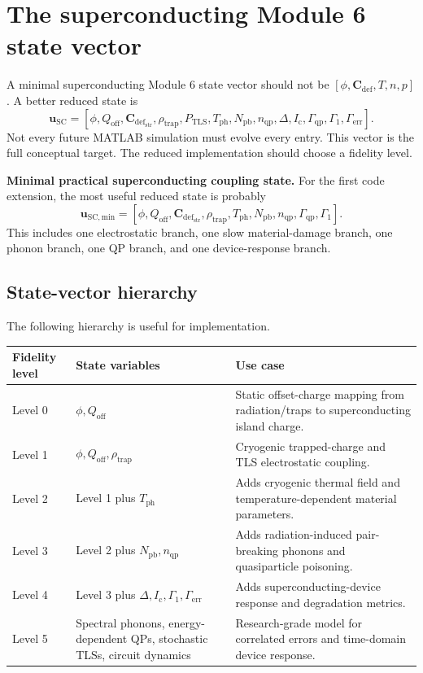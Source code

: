 \documentclass[11pt]{article}
\newcommand{\phiE}{\phi}
\newcommand{\Qoff}{Q_{\mathrm{off}}}
\newcommand{\Cvec}{\bm{C}_{\mathrm{def}}}
\newcommand{\TLS}{\mathrm{TLS}}
\newcommand{\Tph}{T_{\mathrm{ph}}}
\newcommand{\Npb}{N_{\mathrm{pb}}}
\newcommand{\DeltaSC}{\Delta}
\newcommand{\nqp}{n_{\mathrm{qp}}}
\newcommand{\Gammaqp}{\Gamma_{\mathrm{qp}}}
\newcommand{\Gammaone}{\Gamma_1}
\newcommand{\Gammaerr}{\Gamma_{\mathrm{err}}}
\newcommand{\Ic}{I_{\mathrm{c}}}
\newcommand{\state}{\bm{u}}
\begin{document}
\section{The superconducting Module 6 state vector}

A minimal superconducting Module 6 state vector should not be
\( [\phiE,\Cvec,T,n,p] \). A better reduced state is
\begin{equation}
\boxed{
\state_{\mathrm{SC}}=
\left[
\phiE,
\Qoff,
\Cvec_{\mathrm{str}},
\rho_{\mathrm{trap}},
P_{\TLS},
\Tph,
\Npb,
\nqp,
\DeltaSC,
\Ic,
\Gammaqp,
\Gammaone,
\Gammaerr
\right].}
\end{equation}
Not every future MATLAB simulation must evolve every entry. This vector is the full conceptual target. The reduced implementation should choose a fidelity level.

\begin{physicsbox}
\textbf{Minimal practical superconducting coupling state.} For the first code extension, the most useful reduced state is probably
\begin{equation}
\state_{\mathrm{SC,min}}=
\left[\phiE,\Qoff,\Cvec_{\mathrm{str}},\rho_{\mathrm{trap}},\Tph,\Npb,\nqp,\Gammaqp,\Gammaone\right].
\end{equation}
This includes one electrostatic branch, one slow material-damage branch, one phonon branch, one QP branch, and one device-response branch.
\end{physicsbox}

\subsection{State-vector hierarchy}

The following hierarchy is useful for implementation.

\begin{center}
\begin{tabularx}{\textwidth}{p{}p{}X}
\toprule
\textbf{Fidelity level} & \textbf{State variables} & \textbf{Use case}\\
\midrule
Level 0 & \(\phiE,\Qoff\) & Static offset-charge mapping from radiation/traps to superconducting island charge.\\
Level 1 & \(\phiE,\Qoff,\rho_{\mathrm{trap}}\) & Cryogenic trapped-charge and TLS electrostatic coupling.\\
Level 2 & Level 1 plus \(\Tph\) & Adds cryogenic thermal field and temperature-dependent material parameters.\\
Level 3 & Level 2 plus \(\Npb,\nqp\) & Adds radiation-induced pair-breaking phonons and quasiparticle poisoning.\\
Level 4 & Level 3 plus \(\DeltaSC,\Ic,\Gammaone,\Gammaerr\) & Adds superconducting-device response and degradation metrics.\\
Level 5 & Spectral phonons, energy-dependent QPs, stochastic TLSs, circuit dynamics & Research-grade model for correlated errors and time-domain device response.\\
\bottomrule
\end{tabularx}
\end{center}
\end{document}
